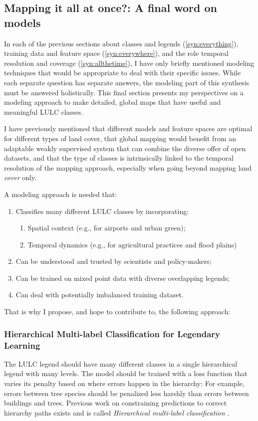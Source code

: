     \subsection{Mapping it all at once?: A final word on models}

        In each of the previous sections about classes and legends (\ref{syn:everything}), training data and feature space (\ref{syn:everywhere}), and the role temporal resolution and coverage (\ref{syn:allthetime}), I have only briefly mentioned modeling techniques that would be appropriate to deal with their specific issues. While each separate question has separate answers, the modeling part of this synthesis must be answered holistically. This final section presents my perspectives on a modeling approach to make detailed, global maps that have useful and meaningful LULC classes. 
        
        I have previously mentioned that different models and feature spaces are optimal for different types of land cover, that global mapping would benefit from an adaptable weakly supervised system that can combine the diverse offer of open datasets, and that the type of classes is intrinsically linked to the temporal resolution of the mapping approach, especially when going beyond mapping land \textit{cover} only.

        A modeling approach is needed that:
        \begin{enumerate}
            \item Classifies many different LULC classes by incorporating:
            \begin{enumerate}
                \item Spatial context (e.g., for airports and urban green);
                \item Temporal dynamics (e.g., for agricultural practices and flood plains)
            \end{enumerate}
            \item Can be understood and trusted by scientists and policy-makers;
            \item Can be trained on mixed point data with diverse overlapping legends;
            \item Can deal with potentially imbalanced training dataset.
        \end{enumerate}

        That is why I propose, and hope to contribute to, the following approach:

        \subsubsection{Hierarchical Multi-label Classification for Legendary Learning}
            The LULC legend should have many different classes in a single hierarchical legend with many levels. The model should be trained with a loss function that varies its penalty based on where errors happen in the hierarchy: For example, errors between tree species should be penalized less harshly than errors between buildings and trees. Previous work on constraining predictions to correct hierarchy paths exists and is called \textit{Hierarchical multi-label classification} \citep{wehrmann2018hierarchical}.

